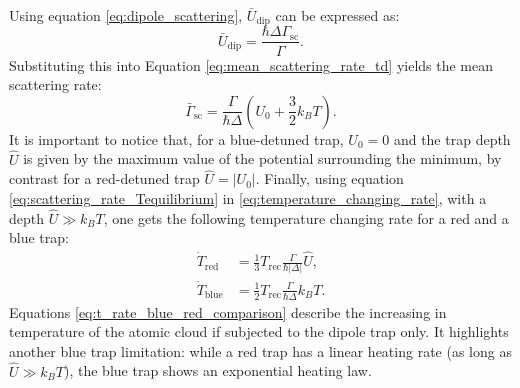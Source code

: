 Using equation \eqref{eq:dipole_scattering}, $\bar{U}_\text{dip}$ can be expressed as:
\begin{equation}
    \bar{U}_\text{dip} = \frac{\hbar \Delta \Gamma_\text{sc}}{\Gamma}.
\end{equation}
Substituting this into Equation \eqref{eq:mean_scattering_rate_td} yields the mean scattering rate:
\begin{equation}
    \label{eq:scattering_rate_Tequilibrium}
    \bar{\Gamma}_\text{sc} = \frac{\Gamma}{\hbar\Delta} (U_0 + \frac{3}{2}k_B T).
\end{equation}
It is important to notice that, for a blue-detuned trap, $U_0 = 0$ and the trap depth $\hat{U}$ is given by the maximum value of the potential surrounding the minimum, by contrast for a red-detuned trap $\hat{U}=|U_0|$.
Finally, using equation \eqref{eq:scattering_rate_Tequilibrium} in \eqref{eq:temperature_changing_rate}, with a depth $\hat{U} \gg k_BT$, one gets the following temperature changing rate for a red and a blue trap:
\begin{subequations}
    \label{eq:t_rate_blue_red_comparison}
    \begin{align}
        \dot{T}_{\text{red}} &= \frac{1}{3} T_{\text{rec}} \frac{\Gamma}{\hbar |\Delta|} \hat{U}, \\[2mm]
        \dot{T}_{\text{blue}} &= \frac{1}{2} T_{\text{rec}} \frac{\Gamma}{\hbar \Delta} k_B T.
    \end{align}
\end{subequations}
Equations \eqref{eq:t_rate_blue_red_comparison} describe the increasing in temperature of the atomic cloud if subjected to the dipole trap only. It highlights another blue trap limitation: while a red trap has a linear heating rate (as long as $\hat{U}\gg k_BT$), the blue trap shows an exponential heating law.